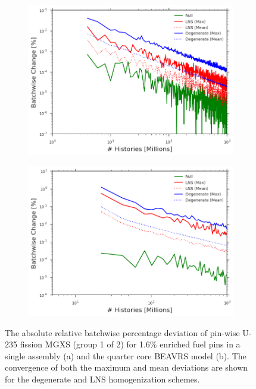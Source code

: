 \begin{figure}[h!]
\centering
\begin{subfigure}{.87\textwidth}
  \centering
  \includegraphics[width=\linewidth]{figures/patterns/convergence/assm-16/assm-16-dev-capture-1}
  \caption{}
  \label{fig:chap9-assm-16-dev-capt-1}
\end{subfigure}
\begin{subfigure}{.87\textwidth}
  \centering
  \includegraphics[width=\linewidth]{figures/patterns/convergence/full-core/16-enr-dev-capture-1}
  \caption{}
  \label{fig:chap9-full-core-dev-capt-1}
\end{subfigure}
\caption[Convergence of U-238 capture MGXS batchwise deviation]{The absolute relative batchwise percentage deviation of pin-wise U-235 fission \ac{MGXS} (group 1 of 2) for 1.6\% enriched fuel pins in a single assembly (a) and the quarter core \ac{BEAVRS} model (b). The convergence of both the maximum and mean deviations are shown for the degenerate and \ac{LNS} homogenization schemes.}
\label{fig:chap9-capt-1-dev}
\end{figure}

